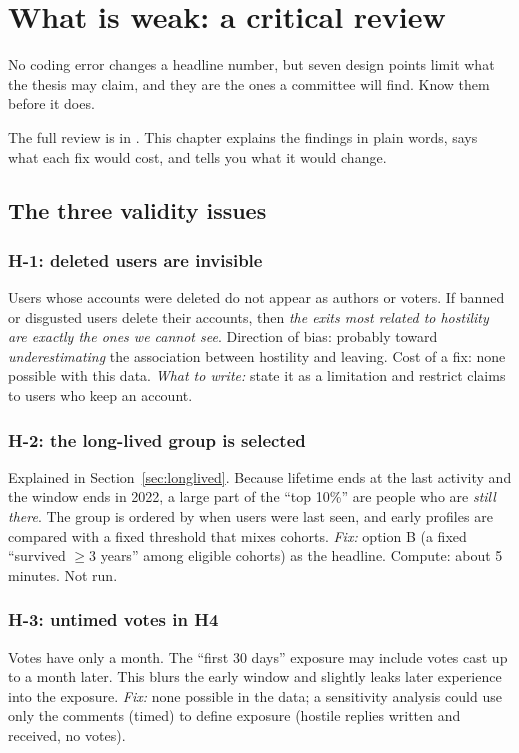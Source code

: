 \chapter{What is weak: a critical review}\label{ch:critique}

\begin{idea}
No coding error changes a headline number, but seven design points limit what the thesis may claim, and they are the ones a committee will find. Know them before it does.
\end{idea}

The full review is in . This chapter explains the findings in plain words, says what each fix would cost, and tells you what it would change.

\section{The three validity issues}

\subsection*{H-1: deleted users are invisible}
Users whose accounts were deleted do not appear as authors or voters. If banned or disgusted users delete their accounts, then \emph{the exits most related to hostility are exactly the ones we cannot see}. Direction of bias: probably toward \emph{underestimating} the association between hostility and leaving. Cost of a fix: none possible with this data. \emph{What to write:} state it as a limitation and restrict claims to users who keep an account.

\subsection*{H-2: the long-lived group is selected}
Explained in Section~\ref{sec:longlived}. Because lifetime ends at the last activity and the window ends in 2022, a large part of the ``top 10\%'' are people who are \emph{still there}. The group is ordered by when users were last seen, and early profiles are compared with a fixed threshold that mixes cohorts. \emph{Fix:} option B (a fixed ``survived $\ge3$ years'' among eligible cohorts) as the headline. Compute: about 5 minutes. Not run.

\subsection*{H-3: untimed votes in H4}
Votes have only a month. The ``first 30 days'' exposure may include votes cast up to a month later. This blurs the early window and slightly leaks later experience into the exposure. \emph{Fix:} none possible in the data; a sensitivity analysis could use only the comments (timed) to define exposure (hostile replies written and received, no votes).

